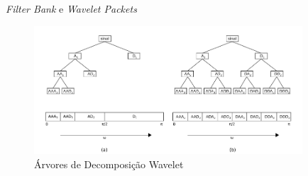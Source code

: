 \documentclass[10pt]{beamer}
\begin{document}

\begin{frame}{\textit{Filter Bank} e \textit{Wavelet Packets}}

  \begin{figure}[]
    \centering
    \includegraphics[width=10cm]{images/filterBankPacket.png}
    \caption{Árvores de Decomposição Wavelet}
  \end{figure}
\end{frame}


\end{document}

